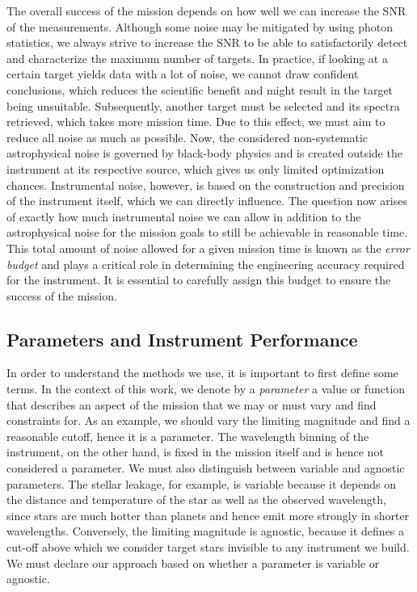 \documentclass[12pt,a4paper]{article}
\numberwithin{equation}{section}
\numberwithin{figure}{section}
\numberwithin{table}{section}
\begin{document}
The overall success of the mission depends on how well we can increase the SNR of the measurements. Although some noise may be mitigated by using photon statistics, we always strive to increase the SNR to be able to satisfactorily detect and characterize the maximum number of targets. In practice, if looking at a certain target yields data with a lot of noise, we cannot draw confident conclusions, which reduces the scientific benefit and might result in the target being unsuitable. Subsequently, another target must be selected and its spectra retrieved, which takes more mission time. Due to this effect, we must aim to reduce all noise as much as possible. Now, the considered non-systematic astrophysical noise is governed by black-body physics and is created outside the instrument at its respective source, which gives us only limited optimization chances. Instrumental noise, however, is based on the construction and precision of the instrument itself, which we can directly influence. The question now arises of exactly how much instrumental noise we can allow in addition to the astrophysical noise for the mission goals to still be achievable in reasonable time. This total amount of noise allowed for a given mission time is known as the \textit{error budget} and plays a critical role in determining the engineering accuracy required for the instrument. It is essential to carefully assign this budget to ensure the success of the mission.

\subsection{Parameters and Instrument Performance} \label{sec: intro: params}
In order to understand the methods we use, it is important to first define some terms. In the context of this work, we denote by a \textit{parameter} a value or function that describes an aspect of the mission that we may or must vary and find constraints for. As an example, we should vary the limiting magnitude and find a reasonable cutoff, hence it is a parameter. The wavelength binning of the instrument, on the other hand, is fixed in the mission itself and is hence not considered a parameter. We must also distinguish between variable and agnostic parameters. The stellar leakage, for example, is variable because it depends on the distance and temperature of the star as well as the observed wavelength, since stars are much hotter than planets and hence emit more strongly in shorter wavelengths. Conversely, the limiting magnitude is agnostic, because it defines a cut-off above which we consider target stars invisible to any instrument we build. We must declare our approach based on whether a parameter is variable or agnostic.
\end{document}
